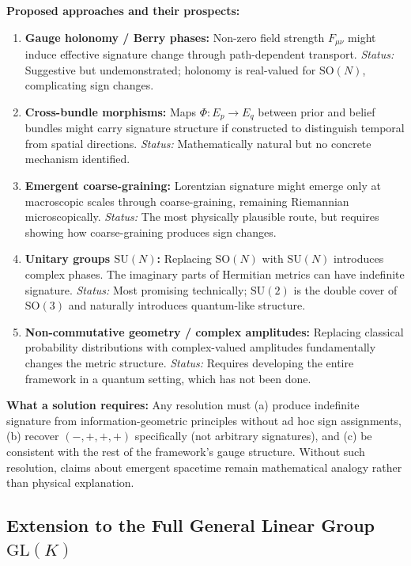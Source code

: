 \documentclass[11pt]{article}
\begin{document}
\textbf{Proposed approaches and their prospects:}
\begin{enumerate}
\item \textbf{Gauge holonomy / Berry phases:} Non-zero field strength $F_{\mu\nu}$ might induce effective signature change through path-dependent transport. \emph{Status:} Suggestive but undemonstrated; holonomy is real-valued for $\mathrm{SO}(N)$, complicating sign changes.

\item \textbf{Cross-bundle morphisms:} Maps $\Phi: E_p \to E_q$ between prior and belief bundles might carry signature structure if constructed to distinguish temporal from spatial directions. \emph{Status:} Mathematically natural but no concrete mechanism identified.

\item \textbf{Emergent coarse-graining:} Lorentzian signature might emerge only at macroscopic scales through coarse-graining, remaining Riemannian microscopically. \emph{Status:} The most physically plausible route, but requires showing how coarse-graining produces sign changes.

\item \textbf{Unitary groups $\mathrm{SU}(N)$:} Replacing $\mathrm{SO}(N)$ with $\mathrm{SU}(N)$ introduces complex phases. The imaginary parts of Hermitian metrics can have indefinite signature. \emph{Status:} Most promising technically; $\mathrm{SU}(2)$ is the double cover of $\mathrm{SO}(3)$ and naturally introduces quantum-like structure.

\item \textbf{Non-commutative geometry / complex amplitudes:} Replacing classical probability distributions with complex-valued amplitudes fundamentally changes the metric structure. \emph{Status:} Requires developing the entire framework in a quantum setting, which has not been done.
\end{enumerate}

\textbf{What a solution requires:} Any resolution must (a) produce indefinite signature from information-geometric principles without ad hoc sign assignments, (b) recover $(-,+,+,+)$ specifically (not arbitrary signatures), and (c) be consistent with the rest of the framework's gauge structure. Without such resolution, claims about emergent spacetime remain mathematical analogy rather than physical explanation.

\subsection{Extension to the Full General Linear Group $\mathrm{GL}(K)$}
\label{sec:glk}
\end{document}
